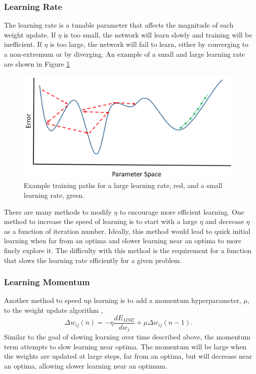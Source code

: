 \subsubsection{Learning Rate}

The learning rate is a tunable parameter that affects the magnitude of each weight update. If $\eta$ is too small, the network will learn slowly and training will be inefficient. If $\eta$ is too large, the network will fail to learn, either by converging to a non-extremum or by diverging. An example of a small and large learning rate are shown in Figure \ref{fig:Learning_rate_comparison} 

\begin{figure}[H]
	\centering
	\includegraphics[width=0.8\linewidth]{images/Learning_rate_comparison_v2}
	\caption{Example training paths for a large learning rate, red, and a small learning rate, green.}
	\label{fig:Learning_rate_comparison}
\end{figure}


There are many methods to modify $\eta$ to encourage more efficient learning. One method to increase the speed of learning is to start with a large $\eta$ and decrease $\eta$ as a function of iteration number. Ideally, this method would lead to quick initial learning when far from an optima and slower learning near an optima to more finely explore it. The difficulty with this method is the requirement for a function that slows the learning rate efficiently for a given problem.

\subsubsection{Learning Momentum}

Another method to speed up learning is to add a momentum hyperparameter, $\mu$, to the weight update algorithm \cite{Yu1997}, 
%
\begin{equation} \label{eq:update_momentum}
\Delta w_{ij}(n) = - \eta \frac{dE_{MSE}}{dw_j} +\mu \Delta w_{ij}(n-1).
\end{equation}
%
Similar to the goal of slowing learning over time described above, the momentum term attempts to slow learning near optima. The momentum will be large when the weights are updated at large steps, far from an optima, but will decrease near an optima, allowing slower learning near an optimum.
 
